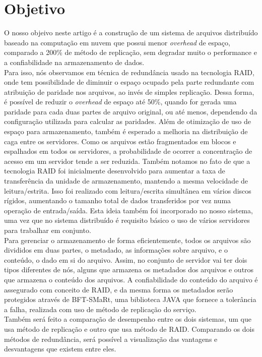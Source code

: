 
\section{Objetivo}

O nosso objeivo neste artigo é a construção de um sistema de arquivos distribuído baseado na computação em nuvem que possui menor \textit{overhead} de espaço, comparado a 200\% de método de replicação, sem degradar muito o performance e a confiabilidade na armazenamento de dados. \\

Para isso, nós observamos em técnica de redundância usado na tecnologia RAID, onde tem possibilidade de diminuir o espaço ocupado pela parte redundante com atribuição de paridade nos arquivos, ao invés de simples replicação. Dessa forma, é possível de reduzir o \textit{overhead} de espaço até 50\%, quando for gerada uma paridade para cada duas partes de arquivo original, ou até menos, dependendo da configuração utilizada para calcular as paridades.
Além de otimização de uso de espaço para armazenamento, também é esperado a melhoria na distribuição de caga entre os servidores. Como os arquivos estão fragmentados em blocos e espalhados em todos os servidores, a probabilidade de ocorrer a concentração de acesso em um servidor tende a ser reduzida.
Também notamos no fato de que a tecnologia RAID foi inicialmente desenvolvido para aumentar a taxa de transferência da unidade de armazenamento, mantendo a mesma velocidade de leitura/estrita. Isso foi realizado com leitura/escrita simultânea em vários discos rígidos, aumentando o tamanho total de dados transferidos por vez numa operação de entrada/saída. Esta ideia também foi incorporado no nosso sistema, uma vez que no sistema distribuído é requisito básico o uso de vários servidores para trabalhar em conjunto.\\

Para gerenciar o armazenamento de forma eficientemente, todos os arquivos são divididos em duas partes, o metadado, as informações sobre arquivo, e o conteúdo, o dado em si do arquivo. 
Assim, no conjunto de servidor vai ter dois tipos diferentes de nós, alguns que armazena os metadados dos arquivos e outros que armazena o conteúdo dos arquivos.
A confiabilidade do conteúdo do arquivo é assegurado com conceito de RAID, e da mesma forma os metadados serão protegidos através de BFT-SMaRt, uma biblioteca JAVA que fornece a tolerância a falha, realizada com uso de método de replicação do serviço.\\


Também será feito a comparação de desempenho entre os dois sistemas, um que usa método de replicação e outro que usa método de RAID.
Comparando os dois métodos de redundância, será possível a visualização das vantagens e desvantagens que existem entre eles.










